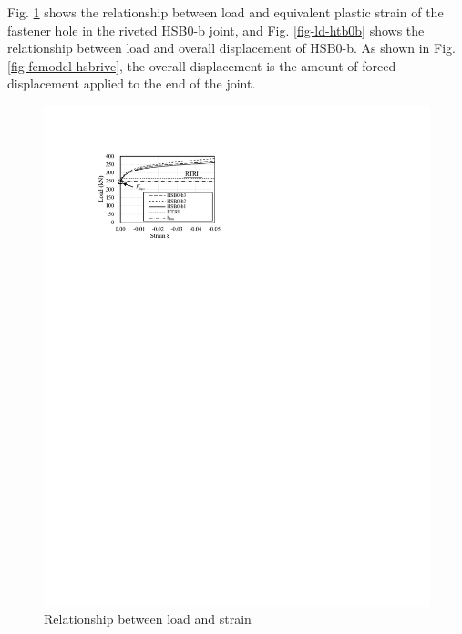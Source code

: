 Fig. \ref{fig-ls-ch4} shows the relationship between load and equivalent plastic strain of the fastener hole in the riveted HSB0-b joint, and Fig. \ref{fig-ld-htb0b} shows the relationship between load and overall displacement of HSB0-b. As shown in Fig. \ref{fig-femodel-hsbrive}, the overall displacement is the amount of forced displacement applied to the end of the joint.

\begin{figure}[htbp]
    \centering
    \begin{minipage}[t]{0.48\textwidth}
    \includegraphics{imgs/ch4/LS-ch4.pdf}
    \caption{Relationship between load and strain}
    \label{fig-ls-ch4}
    \end{minipage}
    \begin{minipage}[t]{0.48\textwidth}

\end{minipage}
\end{figure}
